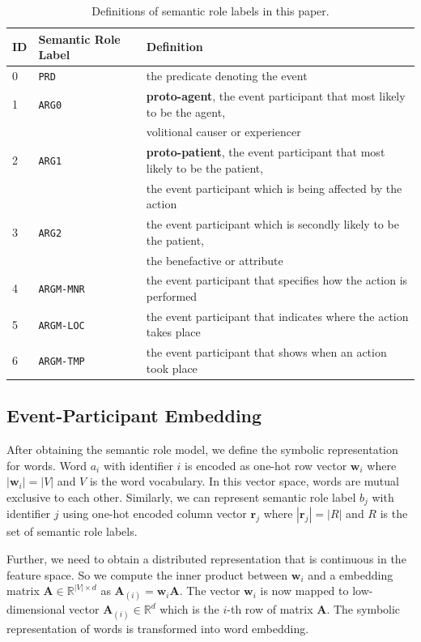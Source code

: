 \documentclass[a4paper]{article}
\begin{document}
\begin{table}[t]
\centering
\begin{tabular}{lll} 
\textbf{ID} &   \textbf{Semantic Role Label}    &   \textbf{Definition} \\  \hline
0           & \texttt{PRD}       &   the predicate denoting the event \\ 
1           & \texttt{ARG0}      &   \textbf{proto-agent}, the event participant that most likely to be the agent, \\     &&   volitional causer or experiencer \\ 
2           & \texttt{ARG1}      &   \textbf{proto-patient}, the event participant that most likely to be the patient, \\ &&   the event participant which is being affected by the action \\ 
3           & \texttt{ARG2}      &   the event participant which is secondly likely to be the patient,  \\       &&   the benefactive or attribute \\ 
4           & \texttt{ARGM-MNR}  &   the event participant that specifies how the action is performed \\ 
5           & \texttt{ARGM-LOC}  &   the event participant that indicates where the action takes place \\ 
6           & \texttt{ARGM-TMP}  &   the event participant that shows when an action took place \\ 
\end{tabular}
\caption{\label{tab:semantic} Definitions of semantic role labels in this paper.}
\end{table}


\subsection{Event-Participant Embedding} \label{sec:epe}
After obtaining the semantic role model, we define the symbolic representation for words. Word $a_i$ with identifier $i$ is encoded as one-hot row vector $\mathbf{w}_i$ where $|\mathbf{w}_i| = |V|$ and $V$ is the word vocabulary. In this vector space, words are mutual exclusive to each other. Similarly, we can represent semantic role label $b_j$ with identifier $j$ using one-hot encoded column vector $\mathbf{r}_j$ where $|\mathbf{r}_j| = |R|$ and $R$ is the set of semantic role labels. 

Further, we need to obtain a distributed representation that is continuous in the feature space. So we compute the inner product between $\mathbf{w}_i$ and a embedding matrix $\mathbf{A} \in \mathbb{R}^{|V| \times d}$ as $\mathbf{A}_{(i)} = \mathbf{w}_i \mathbf{A}$. The vector $\mathbf{w}_i$ is now mapped to low-dimensional vector $\mathbf{A}_{(i)} \in \mathbb{R}^d$ which is the $i$-th row of matrix $\mathbf{A}$. The symbolic representation of words is transformed into word embedding. 
\end{document}
